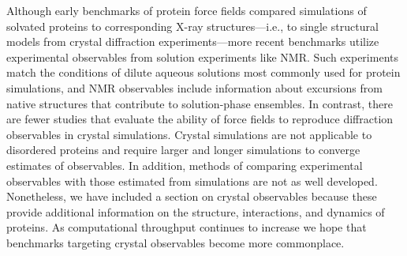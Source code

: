 \documentclass[9pt,review]{livecoms}
\begin{document}
Although early benchmarks of protein force fields compared simulations of solvated proteins to corresponding X-ray structures---i.e., to single structural models from crystal diffraction experiments---more recent benchmarks utilize experimental observables from solution experiments like NMR.
Such experiments match the conditions of dilute aqueous solutions most commonly used for protein simulations, and NMR observables include information about excursions from native structures that contribute to solution-phase ensembles. 
In contrast, there are fewer studies that evaluate the ability of force fields to reproduce diffraction observables in crystal simulations.
Crystal simulations are not applicable to disordered proteins and require larger and longer simulations to converge estimates of observables. In addition, methods of comparing experimental observables with those estimated from simulations are not as well developed.
Nonetheless, we have included a section on crystal observables because these provide additional information on the structure, interactions, and dynamics of proteins.
As computational throughput continues to increase we hope that benchmarks targeting crystal observables become more commonplace.
\end{document}
